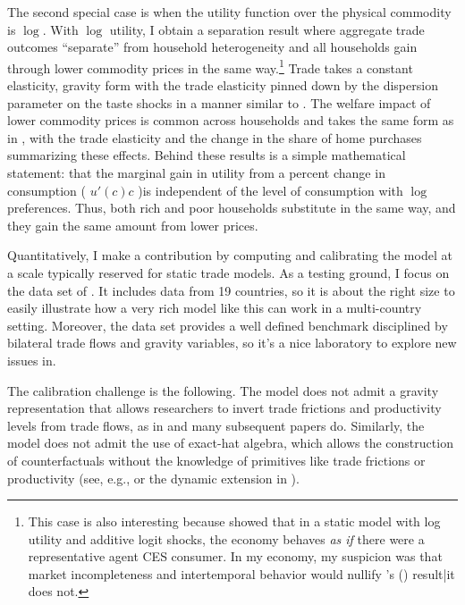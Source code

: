 \documentclass[12pt,pdftex]{article}
\def\citeapos#1{\citeauthor{#1}'s (\citeyear{#1})}
\begin{document}
\begin{onehalfspacing}
The second special case is when the utility function over the physical commodity is $\log$. With $\log$ utility, I obtain a separation result where aggregate trade outcomes ``separate'' from household heterogeneity and all households gain through lower commodity prices in the same way.\footnote{This case is also interesting because \citet{anderson1987ces} showed that in a static model with log utility and additive logit shocks, the economy behaves \emph{as if} there were a representative agent CES consumer. In my economy, my suspicion was that market incompleteness and intertemporal behavior would nullify \citeapos{anderson1987ces} result|it does not.} Trade takes a constant elasticity, gravity form with the trade elasticity pinned down by the dispersion parameter on the taste shocks in a manner similar to \citet{eaton2002technology}. The welfare impact of lower commodity prices is common across households and takes the same form as in \citet{arkolakis2012new}, with the trade elasticity and the change in the share of home purchases summarizing these effects. Behind these results is a simple mathematical statement: that the marginal gain in utility from a percent change in consumption ( $u'(c)c$  )is independent of the level of consumption with $\log$ preferences. Thus, both rich and poor households substitute in the same way, and they gain the same amount from lower prices.

Quantitatively, I make a contribution by computing and calibrating the model at a scale typically reserved for static trade models. As a testing ground, I focus on the data set of \citet{eaton2002technology}. It includes data from 19 countries, so it is about the right size to easily illustrate how a very rich model like this can work in a multi-country setting. Moreover, the \citet{eaton2002technology} data set provides a well defined benchmark disciplined by bilateral trade flows and gravity variables, so it's a nice laboratory to explore new issues in.

The calibration challenge is the following. The model does not admit a gravity representation that allows researchers to invert trade frictions and productivity levels from trade flows, as in \citet{eaton2002technology} and many subsequent papers do. Similarly, the model does not admit the use of exact-hat algebra, which allows the construction of counterfactuals without the knowledge of primitives like trade frictions or productivity (see, e.g., \citet{costinot2014trade} or the dynamic extension in \citet*{caliendo2015trade}).


\end{onehalfspacing}
\end{document}
